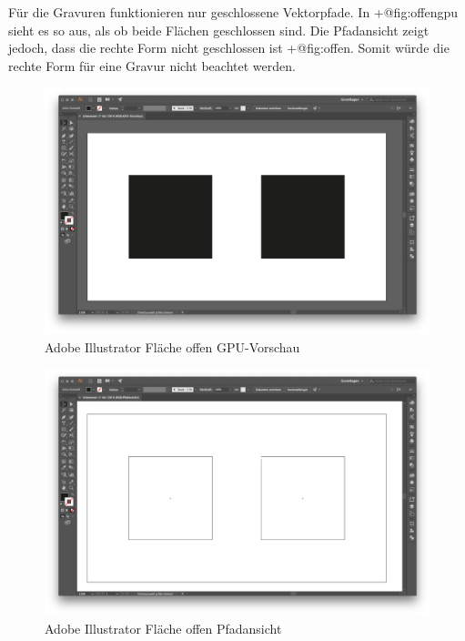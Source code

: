 \documentclass[]{article}
\begin{document}
Für die Gravuren funktionieren nur geschlossene Vektorpfade. In
+@fig:offengpu sieht es so aus, als ob beide Flächen geschlossen sind.
Die Pfadansicht zeigt jedoch, dass die rechte Form nicht geschlossen ist
+@fig:offen. Somit würde die rechte Form für eine Gravur nicht beachtet
werden.

\begin{figure}
\hypertarget{fig:offengpu}{%
\centering
\includegraphics{assets/images/ai-flaeche-offen-gpu.png}
\caption{Adobe Illustrator Fläche offen
GPU-Vorschau}\label{fig:offengpu}
}
\end{figure}

\begin{figure}
\hypertarget{fig:offen}{%
\centering
\includegraphics{assets/images/ai-flaeche-offen.png}
\caption{Adobe Illustrator Fläche offen Pfadansicht}\label{fig:offen}
}
\end{figure}

\newpage
\end{document}
